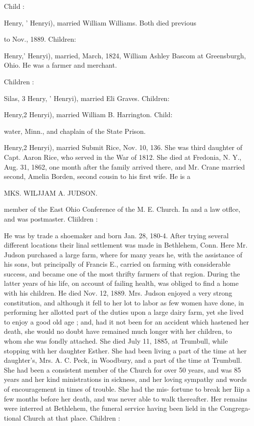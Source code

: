 \documentclass{book}
\begin{document}
Child : 


Henry, ' Henryi), married William Williams. Both died previous 

to Nov., 1889. Children: 



Henry,' Henryi), married, March, 1824, William Ashley Bascom 
at Greensburgh, Ohio. He was a farmer and merchant. 

Children : 





Silas, 3 Henry, ' Henryi), married Eli Graves. Children: 










Henry,2 Henryi), married William B. Harrington. Child: 

water, Minn., and chaplain of the State Prison. 

Henry,2 Henryi), married Submit Rice, Nov. 10, 136. She 
was third daughter of Capt. Aaron Rice, who served in the War 
of 1812. She died at Fredonia, N. Y., Aug. 31, 1862, one 
month after the family arrived there, and Mr. Crane married 
second, Amelia Borden, second cousin to his first wife. He is a 




MKS. WILJJAM A. JUDSON. 




member of the East Ohio Conference of the M. E. Church. In 
and a law otflce, and was postmaster. Cliildren : 




He was by trade a shoemaker and born Jan. 28, 180-4. After 
trying several different locations their linal settlement was made 
in Bethlehem, Conn. Here Mr. Judson purchased a large farm, 
where for many years he, with the assistance of his sons, but 
principally of Francis E., carried on farming with considerable 
success, and became one of the most thrifty farmers of that 
region. During the latter years of his life, on account of failing 
health, was obliged to find a home with his children. He died 
Nov. 12, 1889. Mrs. Judson enjoyed a very strong constitution, 
and although it fell to her lot to labor as few women have done, 
in performing her allotted part of the duties upon a large dairy 
farm, yet she lived to enjoy a good old age ; and, had it not been 
for an accident which hastened her death, she would no doubt 
have remained much longer with her children, to whom she was 
fondly attached. She died July 11, 1885, at Trumbull, while 
stopping with her daughter Esther. She had been living a part 
of the time at her daughter's, Mrs. A. C. Peck, in Woodbury, 
and a part of the time at Trumbull. She had been a consistent 
member of the Church for over 50 years, and was 85 years and 
her kind ministrations in sickness, and her loving sympathy and 
words of encouragement in times of trouble. She had the mis- 
fortune to break her Iiip a few months before her death, and was 
never able to walk thereafter. Her remains were interred at 
Bethlehem, the funeral service having been lield in the Congrega- 
tional Church at that place. Children : 
\end{document}
